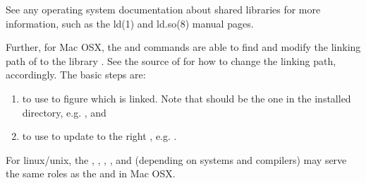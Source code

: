 \begin{enumerate}
\begin{Code}
See any operating system documentation about shared libraries for
more information, such as the ld(1) and ld.so(8) manual pages.
\end{Code}
    Further, for Mac OSX, the  and 
    commands are able to find and modify the linking path of 
    to the library .
    See the source of
     for how to change the linking path,
    accordingly. The basic steps are:
    \begin{enumerate}
    \item to use  to figure which
           is linked. Note that 
          should be the one in the installed directory, e.g.
          ,
          and
    \item to use 
          to update to the right , e.g.
          .
    \end{enumerate}
    For linux/unix, the , , ,
    , and  (depending on systems and
    compilers) may serve the same roles as the  and
     in Mac OSX.
\end{enumerate}
